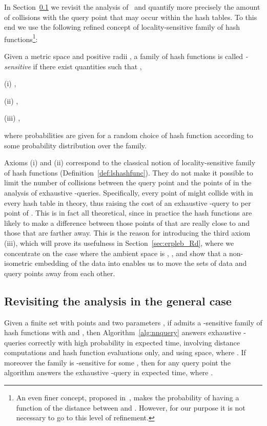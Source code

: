 In Section~\ref{sec:erpleb_general} we revisit the analysis
of~\cite[Chapters~1 and~3]{SDI05} and quantify more precisely the
amount of collisions with the query point that may occur within the
hash tables. To this end we use the following refined concept of
locality-sensitive family of hash functions\footnote{An even finer
  concept, proposed in~\cite[\textsection~3.3]{SDI05}, makes the
  probability of having  a function of the distance between
   and . However, for our purpose it is not necessary to go to
  this level of refinement.}:
\begin{defn}\label{def:stronglshashfunc}
  Given a metric space  and positive radii , a family  of hash functions is
  called {\em -sensitive} if there exist
  quantities  such that ,
  \begin{slist}
  \item[\rm (i)]   ,
  \item[\rm (ii)]   ,
  \item[\rm (iii)]   ,
  \end{slist}
  where probabilities are given for a random choice of hash function
   according to some probability distribution
  over the family.
\end{defn}
Axioms (i) and (ii) correspond to the classical notion of
locality-sensitive family of hash functions
(Definition~\ref{def:lshashfunc}). They do not make it possible to
limit the number of collisions between the query point  and the
points of  in the analysis of exhaustive
-\pleb queries. Specifically, every point of 
might collide with  in every hash table in theory, thus raising the
cost of an exhaustive -\pleb query to  per
point of . This is in fact all theoretical, since
in practice the hash functions are likely to make a difference between
those points of  that are really close to  and
those that are farther away. This is the reason for introducing the
third axiom (iii), which will prove its usefulness in
Section~\ref{sec:erpleb_Rd}, where we concentrate on the case where
the ambient space is , , and show that a
non-isometric embedding of the data into  enables
us to move the sets of data and query points away from each other.


\subsection{Revisiting the analysis in the general case}
\label{sec:erpleb_general}

\begin{thm} \label{thm:allnn}
  Given a finite set  with  points and two parameters
  , if  admits a -sensitive family  of hash functions with  and
  , then Algorithm~\ref{alg:nnquery} answers
  exhaustive -\pleb queries correctly with high probability in
  expected  time,
  involving  distance computations and  hash function
  evaluations only, and using  space, where
  . If moreover the family  is
  -sensitive for some ,
  then for any query point  the algorithm answers the exhaustive
  -\pleb query in expected 
  time, where .
\end{thm}


